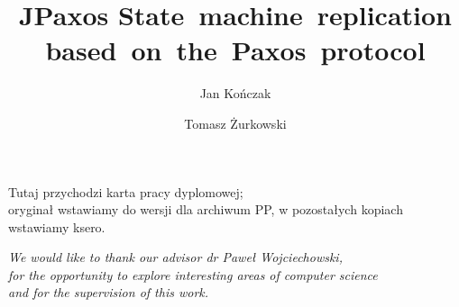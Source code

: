 \documentclass[english,bachelor,a4paper,oneside,12pt]{ppfcmthesis}
\author{%
   Jan Kończak \album{84822} \and 
   Tomasz Żurkowski \album{84915}}
\title{{\Huge JPaxos} \hspace{5em} State~machine~replication based~on~the~Paxos~protocol}
\begin{document}
\frontmatter\pagestyle{empty}%
\maketitle\cleardoublepage%

\thispagestyle{empty}\vspace*{\fill}%
\begin{center}Tutaj przychodzi karta pracy dyplomowej;\\oryginał wstawiamy do wersji dla archiwum PP, w pozostałych kopiach wstawiamy ksero.\end{center}%
\vfill\cleardoublepage%

\thispagestyle{empty}\vspace*{\fill}
\vspace{10cm}
\begin{flushright}\large\textit{We would like to thank our advisor dr Pawe\l{}
Wojciechowski,\\ for the opportunity to explore interesting areas of computer
science\\ and for the supervision of this work.}\end{flushright}%
\vfill\cleardoublepage


\pagestyle{ppfcmthesis}%
\tableofcontents* \cleardoublepage%


\mainmatter%








\cleardoublepage\appendix%
\setcounter{pageTemp}{\value{page}}



\setcounter{page}{\value{pageTemp}}

{\raggedright\sloppy\small}

\ppcolophon
\end{document}
